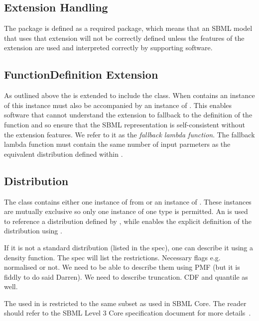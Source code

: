 \documentclass[draftspec]{sbmlpkgspec}
\begin{document}
\subsection{Extension Handling}

The \distrib package is defined as a required package, which means
that an SBML model that uses that extension will not be correctly
defined unless the features of the extension are used and interpreted
correctly by supporting software.

\subsection{FunctionDefinition Extension}

As outlined above the \FunctionDefinition is extended to include the
\Distribution class. When \FunctionDefinition contains an instance
of \Distribution this instance must also be accompanied \watchout by
an instance of \mlambda. This enables software that cannot understand
the extension to fallback to the \mlambda definition of the function
and so ensure that the SBML representation is self-consistent without
the extension features. We refer to it as the \emph{fallback lambda
  function}.  The fallback lambda function must contain the same
number of input parmeters as the equivalent distribution defined
within \Distribution.

\subsection{Distribution}
\label{sec:distribution}

The  class contains either one instance of
\unidistrib from \uncertml or an instance of \mlambda. These instances
are mutually exclusive so only one instance of one type is
permitted. An \unidistrib is used to reference a distribution defined
by \uncertml, while \mlambda enables the explicit definition of the
distribution using \mathml.

If it is not a standard distribution (listed in the spec), one can
describe it using a density function. The spec will list the
restrictions. Necessary flags e.g. normalised or not. We need to be
able to describe them using PMF (but it is fiddly to do said
Darren). We need to describe truncation. CDF and quantile as well.

The \mathml used in \mlambda is restricted to the same subset as used
in SBML Core. The reader should refer to the SBML Level 3 Core
specification document for more details~\cite{l3v1c}.
\end{document}
